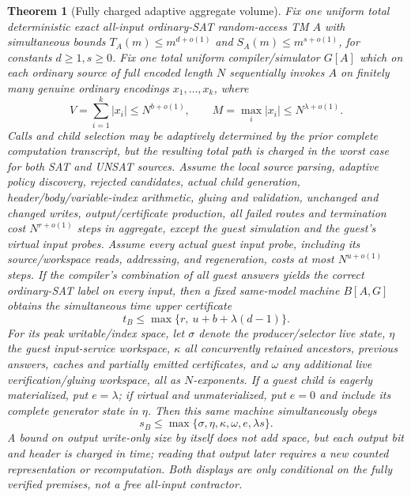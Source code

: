 \documentclass[11pt]{article}
\newtheorem{theorem}{Theorem}
\begin{document}
\begin{theorem}[Fully charged adaptive aggregate volume]
Fix \emph{one} uniform total deterministic exact all-input ordinary-SAT
random-access TM $A$ with simultaneous bounds
$T_A(m)\le m^{d+o(1)}$ and
$S_A(m)\le m^{s+o(1)}$, for constants $d\ge1,s\ge0$.
Fix one total uniform compiler/simulator $G[A]$ which on \emph{each}
ordinary source of full encoded length $N$ sequentially invokes $A$ on
finitely many \emph{genuine} ordinary encodings
$x_1,\ldots,x_k$, where
\[
 V=\sum_{i=1}^{k}|x_i|\le N^{b+o(1)},
 \qquad M=\max_i|x_i|\le N^{\lambda+o(1)}.
\]
Calls and child selection may be adaptively determined by the prior
complete computation transcript, but the resulting total path is charged
in the worst case for both SAT and UNSAT sources. Assume the local
source parsing, adaptive policy discovery, rejected candidates,
actual child generation, header/body/variable-index arithmetic,
gluing and validation, unchanged \emph{and} changed writes,
output/certificate production, all failed routes and termination cost
$N^{r+o(1)}$ steps in aggregate, except the guest simulation
and the guest's virtual input probes. Assume \emph{every actual guest
input probe}, including its source/workspace reads, addressing, and
regeneration, costs at most $N^{u+o(1)}$ steps.
If the compiler's combination of all guest answers yields the correct
ordinary-SAT label on \emph{every} input, then a fixed same-model machine
$B[A,G]$ obtains the simultaneous \emph{time upper certificate}
\[
 \boxed{\quad
 t_B\le \max\{r,\ u+b+\lambda(d-1)\}.\quad} \tag{1}
\]
For its \emph{peak writable/index space}, let $\sigma$ denote the
producer/selector live state, $\eta$ the guest input-service workspace,
$\kappa$ all concurrently retained ancestors, previous answers,
caches and partially emitted certificates, and $\omega$ any additional
live verification/gluing workspace, all as $N$-exponents.
If a guest child is \emph{eagerly materialized}, put $e=\lambda$;
if virtual and unmaterialized, put $e=0$ and include its complete
generator state in $\eta$. Then this same machine simultaneously obeys
\[
 \boxed{\quad
 s_B\le\max\{\sigma,\eta,\kappa,\omega,e,\lambda s\}.
 \quad} \tag{2}
\]
A bound on output \emph{write-only} size by itself does not add space,
but each output bit and header is charged in time; reading that output
later requires a new counted representation or recomputation.
Both displays are only conditional on the fully verified premises,
not a free all-input contractor.
\end{theorem}
\end{document}
